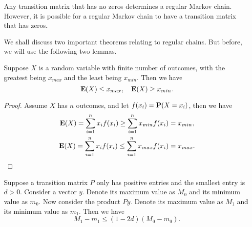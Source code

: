 \begin{remark}
Any transition matrix that has no zeros determines a regular Markov chain. However, it is possible for a regular Markov chain to have a transition matrix that has zeros.
\end{remark}

We shall discuss two important theorems relating to regular chains. But before, we will use the following two lemmas.

\begin{lemma}
\label{lemma:8.1}
Suppose $X$ is a random variable with finite number of outcomes, with the greatest being $x_{max}$ and the least being $x_{min}$. Then we have 
\begin{equation*}
    \mathbf{E}(X) \leq x_{max}, \quad \mathbf{E}(X) \geq x_{min}.
\end{equation*}
\end{lemma}

\begin{proof}
Assume $X$ has $n$ outcomes, and let $f(x_i) = \mathbf{P}(X = x_i)$, then we have
\begin{gather*}
    \mathbf{E}(X) = \sum_{i=1}^n x_i f(x_i) \geq \sum_{i=1}^n x_{min} f(x_i) = x_{min}, \\
    \mathbf{E}(X) = \sum_{i=1}^n x_i f(x_i) \leq \sum_{i=1}^n x_{max} f(x_i) = x_{max}.
\end{gather*}
\end{proof}

\begin{lemma}
\label{lemma:8.2}
Suppose a transition matrix $P$ only has positive entries and the smallest entry is $d>0$. Consider a vector $y$. Denote its maximum value as $M_0$ and its minimum value as $m_0$. Now consider the product $Py$. Denote its maximum value as $M_1$ and its minimum value as $m_1$. Then we have
\begin{equation*}
    M_1 - m_1 \leq (1-2d) (M_0 - m_0).
\end{equation*}
\end{lemma}

